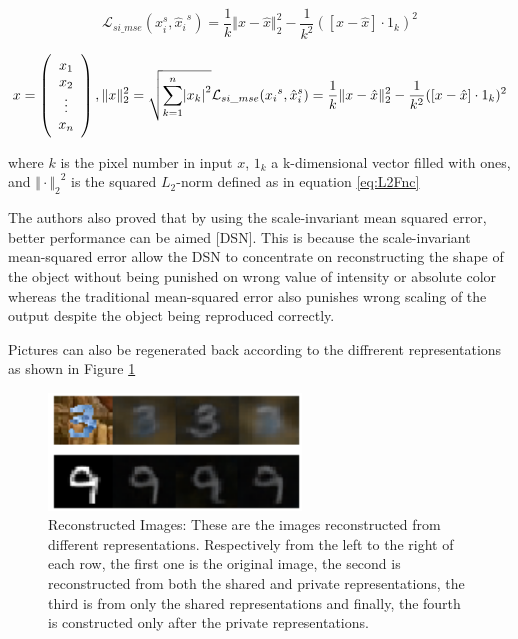 	\begin{equation} \label{eq:si_mse}
			\mathcal{L}_{si\_{mse}}(x_i^s, {\hat{x}_i}^s) = \frac{1}{k} \Vert x - \hat{x}{\Vert_2^2} - \frac{1}{k^2} ([x - \hat{x}] \cdot 1_k)^2
	\end{equation}

	\begin{equation} \label{eq:L2Fnc}
			x = \left(\begin{array}{c} x_1\\ x_2\\ \vdots \\ x_n \end{array} \right),
			\Vert x {\Vert_2^2} = \sqrt{\overset{n}{\underset{k = 1}{\sum}}{|x_k|}^2} \\
			\mathcal{L}_{si\_{mse}}({x_i}^s, {\hat{x}_i}^s) = \frac{1}{k} \Vert x - \hat{x}{\Vert_2^2} - \frac{1}{k^2} ([x - \hat{x}] \cdot 1_k)^2
	\end{equation}

where $k$ is the pixel number in input $x$, $1_k$ a k-dimensional vector filled with ones, and $\Vert \cdot {\Vert_2}^2$ is the squared $L_2$-norm defined as in equation \ref{eq:L2Fnc}

The authors also proved that by using the scale-invariant mean squared error, better performance can be aimed [DSN]. This is because the scale-invariant mean-squared error allow the DSN to concentrate on reconstructing the shape of the object without being punished on wrong value of intensity or absolute color whereas the traditional mean-squared error also punishes wrong scaling of the output despite the object being reproduced correctly. 

Pictures can also be regenerated back according to the diffrerent representations as shown in Figure \ref{fig:reconImg}

\begin{figure}[tbh]
  \centering
    \includegraphics[width=0.6\textwidth]{abbildungen/reconPic.png}
  \caption{Reconstructed Images: These are the images reconstructed from different representations. Respectively from the left to the right of each row, the first one is the original image, the second is reconstructed from both the shared and private representations, the third is from only the shared representations and finally, the fourth is constructed only after the private representations.}
\label{fig:reconImg}
\end{figure}


